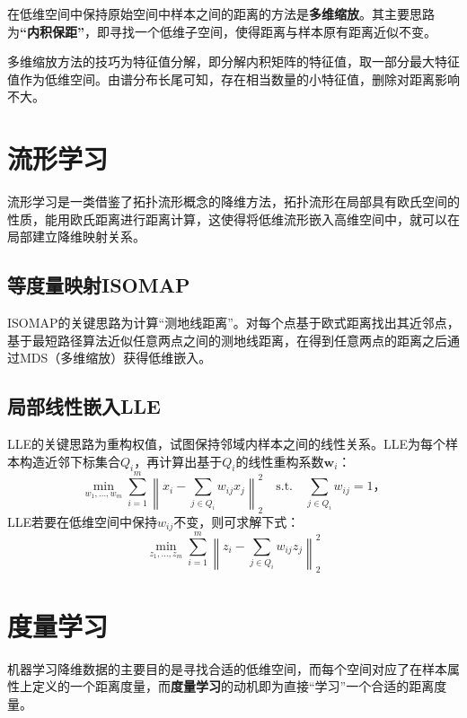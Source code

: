 在低维空间中保持原始空间中样本之间的距离的方法是\textbf{多维缩放}。其主要思路为\textbf{“内积保距”}，即寻找一个低维子空间，使得距离与样本原有距离近似不变。

多维缩放方法的技巧为特征值分解，即分解内积矩阵的特征值，取一部分最大特征值作为低维空间。由谱分布长尾可知，存在相当数量的小特征值，删除对距离影响不大。

\section{流形学习}\label{sec:10.3}
流形学习是一类借鉴了拓扑流形概念的降维方法，拓扑流形在局部具有欧氏空间的性质，能用欧氏距离进行距离计算，这使得将低维流形嵌入高维空间中，就可以在局部建立降维映射关系。

\subsection{等度量映射ISOMAP}
ISOMAP的关键思路为计算“测地线距离”。对每个点基于欧式距离找出其近邻点，基于最短路径算法近似任意两点之间的测地线距离，在得到任意两点的距离之后通过MDS（多维缩放）获得低维嵌入。

\subsection{局部线性嵌入LLE}
LLE的关键思路为重构权值，试图保持邻域内样本之间的线性关系。LLE为每个样本构造近邻下标集合$Q_i$，再计算出基于$Q_i$的线性重构系数$\boldsymbol w_i$：
\[
\min _{w_{1}, \ldots, w_{m}} \sum_{i=1}^{m}\left\|x_{i}-\sum_{j \in Q_{i}} w_{i j} x_{j}\right\|_{2}^{2} \quad \text{s.t.}
\quad \sum_{j \in Q_{i}} w_{i j}=1，
\]LLE若要在低维空间中保持$w_{i j}$不变，则可求解下式：\[
\min _{z_{1}, \ldots, z_{m}} \sum_{i=1}^{m}\left\|z_{i}-\sum_{j \in Q_{i}} w_{i j} z_{j}\right\|_{2}^{2}
\]

\section{度量学习}\label{sec:10.4}
机器学习降维数据的主要目的是寻找合适的低维空间，而每个空间对应了在样本属性上定义的一个距离度量，而\textbf{度量学习}的动机即为直接“学习”一个合适的距离度量。

